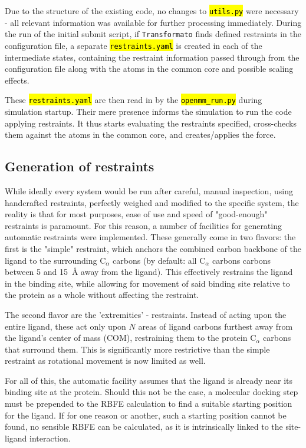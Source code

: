 \documentclass[oneside]{scrreprt}
\newcommand{\code}[1]{\texttt{\hl{#1}}}
\begin{document}
Due to the structure of the existing code, no changes to \code{utils.py} were necessary - all relevant information was available for further processing immediately. During the run of the initial submit script, if \texttt{Transformato} finds defined restraints in the configuration file, a separate \code{restraints.yaml} is created in each of the intermediate states, containing the restraint information passed through from the configuration file along with the atoms in the common core and possible scaling effects.

These \code{restraints.yaml} are then read in by the \code{openmm\_run.py} during simulation startup. Their mere presence informs the simulation to run the code applying restraints. It thus starts evaluating the restraints specified, cross-checks them against the atoms in the common core, and creates/applies the force.

\subsection{Generation of restraints}\label{sec:genrestraint}
While ideally every system would be run after careful, manual inspection, using handcrafted restraints, perfectly weighed and modified to the specific system, the reality is that for most purposes, ease of use and speed of "good-enough" restraints is paramount. For this reason, a number of facilities for generating automatic restraints were implemented. These generally come in two flavors: the first is the "simple" restraint, which anchors the combined carbon backbone of the ligand to the surrounding C$_\alpha$ carbons (by default: all C$_\alpha$ carbons carbons between 5 and 15~{\AA} away from the ligand). This effectively restrains the ligand in the binding site, while allowing for movement of said binding site relative to the protein as a whole without affecting the restraint.

The second flavor are the 'extremities' - restraints. Instead of acting upon the entire ligand, these act only upon $N$ areas of ligand carbons furthest away from the ligand's center of mass (COM), restraining them to the protein C$_\alpha$ carbons that surround them. This is significantly more restrictive than the simple restraint as rotational movement is now limited as well.

For all of this, the automatic facility assumes that the ligand is already near its binding site at the protein. Should this not be the case, a molecular docking step must be prepended to the RBFE calculation to find a suitable starting position for the ligand. If for one reason or another, such a starting position cannot be found, no sensible RBFE can be calculated, as it is intrinsically linked to the site-ligand interaction.
\end{document}
